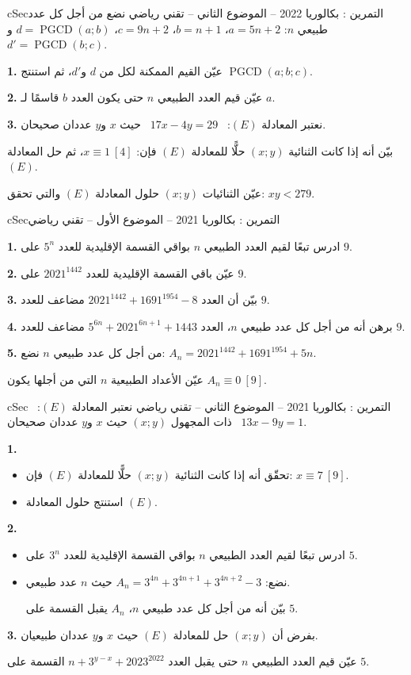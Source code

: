 \documentclass[12pt,a4paper]{article}
\newenvironment{BOX}[2]{\begin{otherlanguage}{english}\begin{arbox}{#1}{#2}}{\end{arbox}\end{otherlanguage}}
\newcounter{exo}
\newenvironment{tamrin}[1]{\stepcounter{exo}\begin{BOX}{cSec}{التمرين \theexo: #1}}{\end{BOX}}
\newcommand{\pgcd}{\operatorname{PGCD}}
\newenvironment{sq}{\begin{itemize}[leftmargin=2.4em,itemsep=3pt]}{\end{itemize}}
\newcommand{\qa}{\item[(أ)]}\newcommand{\qb}{\item[(ب)]}\newcommand{\qc}{\item[(جـ)]}\newcommand{\qd}{\item[(د)]}\newcommand{\qe}{\item[(هـ)]}
\newcommand{\QQ}[1]{\par\smallskip\textbf{#1.} }
\begin{document}
\begin{tamrin}{بكالوريا 2022 -- الموضوع الثاني -- تقني رياضي}
نضع من أجل كل عدد طبيعي $n$: $a=5n+2$، $b=n+1$، $c=9n+2$، $d=\pgcd(a;b)$ و$d'=\pgcd(b;c)$.
\QQ{1} عيّن القيم الممكنة لكل من $d$ و$d'$، ثم استنتج $\pgcd(a;b;c)$.
\QQ{2} عيّن قيم العدد الطبيعي $n$ حتى يكون العدد $b$ قاسمًا لـ $a$.
\QQ{3} نعتبر المعادلة $(E)$: \ $17x-4y=29$ \ حيث $x$ و$y$ عددان صحيحان.

بيّن أنه إذا كانت الثنائية $(x;y)$ حلًّا للمعادلة $(E)$ فإن: $x\equiv 1\ [4]$، ثم حل المعادلة $(E)$.

عيّن الثنائيات $(x;y)$ حلول المعادلة $(E)$ والتي تحقق: $xy<279$.
\end{tamrin}

\begin{tamrin}{بكالوريا 2021 -- الموضوع الأول -- تقني رياضي}
\QQ{1} ادرس تبعًا لقيم العدد الطبيعي $n$ بواقي القسمة الإقليدية للعدد $5^n$ على $9$.
\QQ{2} عيّن باقي القسمة الإقليدية للعدد $2021^{1442}$ على $9$.
\QQ{3} بيّن أن العدد $2021^{1442}+1691^{1954}-8$ مضاعف للعدد $9$.
\QQ{4} برهن أنه من أجل كل عدد طبيعي $n$، العدد $5^{6n}+2021^{6n+1}+1443$ مضاعف للعدد $9$.
\QQ{5} من أجل كل عدد طبيعي $n$ نضع: $A_n=2021^{1442}+1691^{1954}+5n$.

عيّن الأعداد الطبيعية $n$ التي من أجلها يكون $A_n\equiv 0\ [9]$.
\end{tamrin}

\begin{tamrin}{بكالوريا 2021 -- الموضوع الثاني -- تقني رياضي}
نعتبر المعادلة $(E)$: \ $13x-9y=1$ \ ذات المجهول $(x;y)$ حيث $x$ و$y$ عددان صحيحان.
\QQ{1}
\begin{sq}
\qa تحقّق أنه إذا كانت الثنائية $(x;y)$ حلًّا للمعادلة $(E)$ فإن: $x\equiv 7\ [9]$.
\qb استنتج حلول المعادلة $(E)$.
\end{sq}
\QQ{2}
\begin{sq}
\qa ادرس تبعًا لقيم العدد الطبيعي $n$ بواقي القسمة الإقليدية للعدد $3^n$ على $5$.
\qb نضع: $A_n=3^{4n}+3^{4n+1}+3^{4n+2}-3$ حيث $n$ عدد طبيعي.

بيّن أنه من أجل كل عدد طبيعي $n$، $A_n$ يقبل القسمة على $5$.
\end{sq}
\QQ{3} بفرض أن $(x;y)$ حل للمعادلة $(E)$ حيث $x$ و$y$ عددان طبيعيان.

عيّن قيم العدد الطبيعي $n$ حتى يقبل العدد $n+3^{y-x}+2023^{2022}$ القسمة على $5$.
\end{tamrin}
\end{document}
